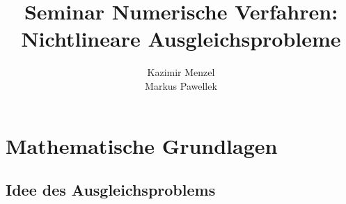 \documentclass[aspectratio=169]{beamer}
\title{Seminar Numerische Verfahren: \\ Nichtlineare Ausgleichsprobleme}
\author{Kazimir Menzel \\ Markus Pawellek}
\begin{document}
	
	\frame{\maketitle}


	\begin{frame}
		\begin{tcolorbox}
			\begin{figure}
				
			\end{figure}
		\end{tcolorbox}
	\end{frame}
	
	\begin{frame}
		\begin{tcolorbox}
			\begin{figure}
				
			\end{figure}
		\end{tcolorbox}
	\end{frame}

	\begin{frame}
		\begin{tcolorbox}
			\begin{figure}
				
			\end{figure}
		\end{tcolorbox}
	\end{frame}
	
	\begin{frame}
	\begin{tcolorbox}
		\begin{figure}
				
			\end{figure}
	\end{tcolorbox}
	\end{frame}



	\section{Mathematische Grundlagen} %
	\label{sec:mathematische_grundlagen}
	
		\subsection{Idee des Ausgleichsproblems} %
		\label{sub:idee_des_ausgleichsproblems}
\end{document}
